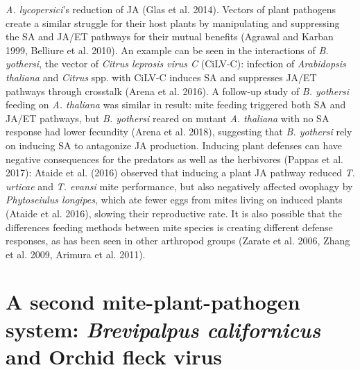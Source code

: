 \documentclass[12pt,final,CPage]{ufthesis}
\begin{document}
{\emph{A. lycopersici}'s reduction of JA (Glas et al. 2014). Vectors of plant pathogens create a similar struggle for their host plants by manipulating and suppressing the SA and JA/ET pathways for their mutual benefits (Agrawal and Karban 1999, Belliure et al. 2010). An example can be seen in the interactions of \emph{B. yothersi}, the vector of \emph{Citrus leprosis virus C} (CiLV-C): infection of \emph{Arabidopsis thaliana} and \emph{Citrus} spp. with CiLV-C induces SA and suppresses JA/ET pathways through crosstalk (Arena et al. 2016). A follow-up study of \emph{B. yothersi} feeding on \emph{A. thaliana} was similar in result: mite feeding triggered both SA and JA/ET pathways, but \emph{B. yothersi} reared on mutant \emph{A. thaliana} with no SA response had lower fecundity (Arena et al. 2018), suggesting that \emph{B. yothersi} rely on inducing SA to antagonize JA production. Inducing plant defenses can have negative consequences for the predators as well as the herbivores (Pappas et al. 2017): Ataide et al. (2016) observed that inducing a plant JA pathway reduced \emph{T. urticae} and \emph{T. evansi} mite performance, but also negatively affected ovophagy by \emph{Phytoseiulus longipes}, which ate fewer eggs from mites living on induced plants (Ataide et al. 2016), slowing their reproductive rate. It is also possible that the differences feeding methods between mite species is creating different defense responses, as has been seen in other arthropod groups (Zarate et al. 2006, Zhang et al. 2009, Arimura et al. 2011).

  \hypertarget{litrev-brevi}{%
  \section{\texorpdfstring{A second mite-plant-pathogen system: \emph{Brevipalpus californicus} and Orchid fleck virus}{A second mite-plant-pathogen system: Brevipalpus californicus and Orchid fleck virus}}\label{litrev-brevi}}

}
\end{document}

